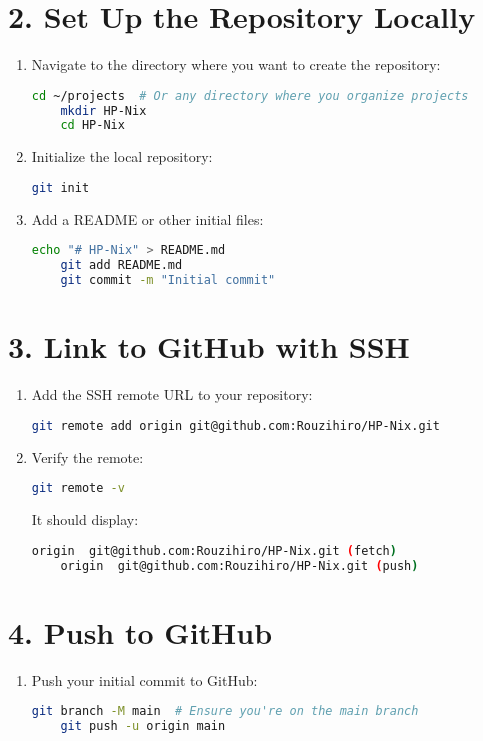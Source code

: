 \documentclass{article}
\begin{document}
\section*{2. Set Up the Repository Locally}
\begin{enumerate}
    \item Navigate to the directory where you want to create the repository:
    \begin{lstlisting}[language=bash]
    cd ~/projects  # Or any directory where you organize projects
    mkdir HP-Nix
    cd HP-Nix
    \end{lstlisting}

    \item Initialize the local repository:
    \begin{lstlisting}[language=bash]
    git init
    \end{lstlisting}

    \item Add a README or other initial files:
    \begin{lstlisting}[language=bash]
    echo "# HP-Nix" > README.md
    git add README.md
    git commit -m "Initial commit"
    \end{lstlisting}
\end{enumerate}

\section*{3. Link to GitHub with SSH}
\begin{enumerate}
    \item Add the SSH remote URL to your repository:
    \begin{lstlisting}[language=bash]
    git remote add origin git@github.com:Rouzihiro/HP-Nix.git
    \end{lstlisting}

    \item Verify the remote:
    \begin{lstlisting}[language=bash]
    git remote -v
    \end{lstlisting}
    It should display:
    \begin{lstlisting}[language=bash]
    origin  git@github.com:Rouzihiro/HP-Nix.git (fetch)
    origin  git@github.com:Rouzihiro/HP-Nix.git (push)
    \end{lstlisting}
\end{enumerate}

\section*{4. Push to GitHub}
\begin{enumerate}
    \item Push your initial commit to GitHub:
    \begin{lstlisting}[language=bash]
    git branch -M main  # Ensure you're on the main branch
    git push -u origin main
    \end{lstlisting}
\end{enumerate}
\end{document}
